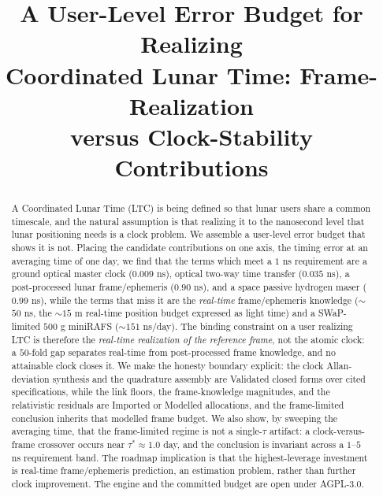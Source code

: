 \documentclass[conference]{IEEEtran}
\begin{document}
\title{A User-Level Error Budget for Realizing\\
Coordinated Lunar Time: Frame-Realization\\
versus Clock-Stability Contributions}

\author{
}

\maketitle

\begin{abstract}
A Coordinated Lunar Time (LTC) is being defined so that lunar users share a common
timescale, and the natural assumption is that realizing it to the nanosecond level
that lunar positioning needs is a clock problem. We assemble a user-level error
budget that shows it is not. Placing the candidate contributions on one axis, the
timing error at an averaging time of one day, we find that the terms which meet a
$1$ ns requirement are a ground optical master clock ($0.009$ ns), optical two-way
time transfer ($0.035$ ns), a post-processed lunar frame/ephemeris ($0.90$ ns), and
a space passive hydrogen maser ($0.99$ ns), while the terms that miss it are the
\emph{real-time} frame/ephemeris knowledge ($\sim$$50$ ns, the $\sim$$15$ m
real-time position budget expressed as light time) and a SWaP-limited $500$ g
miniRAFS ($\sim$$151$ ns/day). The binding constraint on a user realizing LTC is
therefore the \emph{real-time realization of the reference frame}, not the atomic
clock: a $50$-fold gap separates real-time from post-processed frame knowledge, and
no attainable clock closes it. We make the honesty boundary explicit: the clock
Allan-deviation synthesis and the quadrature assembly are Validated closed forms
over cited specifications, while the link floors, the frame-knowledge magnitudes,
and the relativistic residuals are Imported or Modelled allocations, and the
frame-limited conclusion inherits that modelled frame budget. We also show, by
sweeping the averaging time, that the frame-limited regime is not a single-$\tau$
artifact: a clock-versus-frame crossover occurs near $\tau^\ast\approx1.0$ day, and
the conclusion is invariant across a $1$--$5$ ns requirement band. The roadmap
implication is that the highest-leverage investment is real-time frame/ephemeris
prediction, an estimation problem, rather than further clock improvement. The engine
and the committed budget are open under AGPL-3.0.
\end{abstract}
\end{document}
